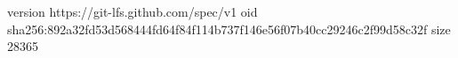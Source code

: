 version https://git-lfs.github.com/spec/v1
oid sha256:892a32fd53d568444fd64f84f114b737f146e56f07b40cc29246c2f99d58c32f
size 28365

